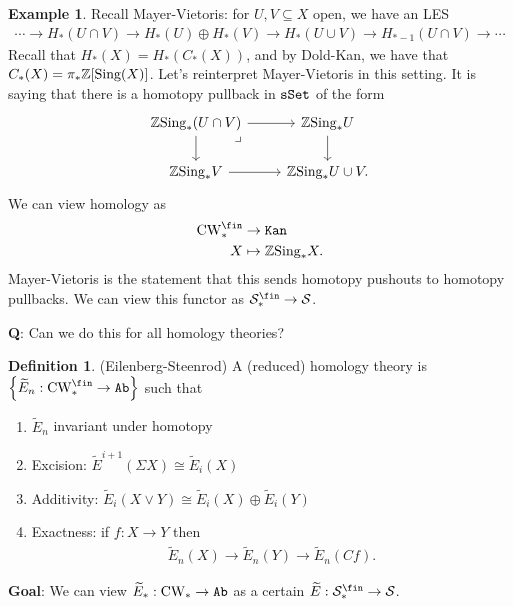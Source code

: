 \documentclass[12pt]{amsart}
\let\til\widetilde
\theoremstyle{definition}
\newtheorem{definition}[theorem]{Definition}
\newtheorem{example}[theorem]{Example}
\providecommand{\CW}{\text{CW}}
\begin{document}
\begin{example} Recall Mayer-Vietoris: for $U,V \subseteq X$ open, we have an LES
\begin{align*}
    \cdots \to H_\ast(U\cap V) \to H_\ast(U) \oplus H_\ast(V) \to H_\ast(U\cup V) \to H_{\ast-1}(U\cap V) \to \cdots
\end{align*}
Recall that $H_\ast(X) = H_\ast(C_\ast(X))$, and by Dold-Kan, we have that $C_\ast(X) = \pi_\ast \mathbb{Z}[\text{Sing}(X)]$. Let's reinterpret Mayer-Vietoris in this setting. It is saying that there is a homotopy pullback in $\texttt{sSet}$ of the form
\[ \begin{tikzcd}
    \Z\Sing_\ast(U\cap V)\rar\dar\pb & \Z\Sing_\ast U\dar\\
    \Z\Sing_\ast V\rar & \Z\Sing_\ast U\cup V.
\end{tikzcd} \]
We can view homology as
\begin{align*}
    \CW_\ast^\fin &\to \Kan \\
    X &\mapsto \Z\Sing_\ast X.
\end{align*}
Mayer-Vietoris is the statement that this sends homotopy pushouts to homotopy pullbacks. We can view this functor as $\mathcal{S}_\ast^\fin \to \mathcal{S}$.
\end{example}

\textbf{Q}: Can we do this for all homology theories?

\begin{definition} (Eilenberg-Steenrod) A (reduced) homology theory is $\left\{ \til{E}_n: \CW_\ast^\fin \to \Ab \right\}$ such that
\begin{enumerate}
    \item $\til{E}_n$ invariant under homotopy
    \item Excision: $\til{E}^{i+1}(\Sigma X) \cong \til{E}_i(X)$
    \item Additivity: $\til{E}_i(X\vee Y) \cong \til{E}_i(X) \oplus \til{E}_i(Y)$
    \item Exactness: if $f: X \to Y$ then
    \begin{align*}
        \til{E}_n(X) \to \til{E}_n(Y) \to \til{E}_n(Cf).
    \end{align*}
\end{enumerate}
\end{definition}

\textbf{Goal}: We can view $\til{E}_\ast : \CW_\ast \to \Ab$ as a certain $\til{E}: \mathcal{S}_\ast^\fin \to \mathcal{S}$.
\end{document}
